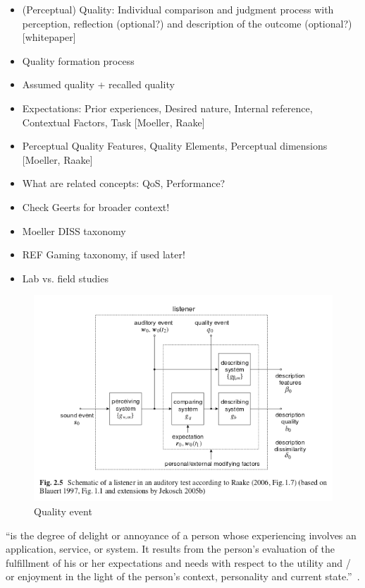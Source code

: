 \begin{itemize}
\item (Perceptual) Quality: Individual comparison and judgment process with perception, reflection (optional?) and description of the outcome (optional?) [whitepaper]
\item Quality formation process
\item Assumed quality + recalled quality
\item Expectations: Prior experiences, Desired nature, Internal reference, Contextual Factors, Task [Moeller, Raake] 
\item Perceptual Quality Features, Quality Elements, Perceptual dimensions [Moeller, Raake]%
\item What are related concepts: QoS, Performance?
\item Check Geerts for broader context!
\item Moeller DISS taxonomy
\item REF Gaming taxonomy, if used later!
\item Lab vs. field studies
\end{itemize}

\begin{figure}
	\includegraphics[width=1\textwidth]{fig/quality-event}
	\caption{Quality event}
	\label{img:chap02:quality-event}
\end{figure}


\begin{definition}
``is the degree of delight or annoyance of a person whose experiencing involves an application, service, or system. It results from the person’s evaluation of the fulfillment of his or her expectations and needs with respect to the utility and / or enjoyment in the light of the person’s context, personality and current state.''~\citep[p. 21]{moller_quality_2014}.
\end{definition}

